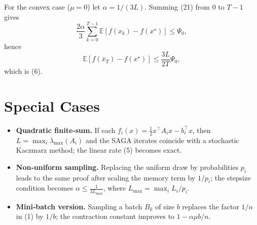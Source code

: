 \documentclass{article}
\begin{document}
For the convex case ($\mu=0$) let $\alpha=1/(3L)$. Summing (21) from $0$ to $T-1$ gives
\[
\frac{2\alpha}{3}\sum_{k=0}^{T-1}\mathbb{E}[f(x_k)-f(x^\star)]
\le \Psi_0,
\]
hence
\[
\mathbb{E}[f(\bar x_T)-f(x^\star)]\le\frac{3L}{2T}\Psi_0,
\]
which is (6).

\section*{Special Cases}
\begin{itemize}
\item \textbf{Quadratic finite‑sum.} If each $f_i(x)=\tfrac12 x^\top A_i x-b_i^\top x$, then $L=\max_i\lambda_{\max}(A_i)$ and the SAGA iterates coincide with a stochastic Kaczmarz method; the linear rate (5) becomes exact.
\item \textbf{Non‑uniform sampling.} Replacing the uniform draw by probabilities $p_i$ leads to the same proof after scaling the memory term by $1/p_i$; the stepsize condition becomes $\alpha\le \frac{1}{3L_{\max}}$, where $L_{\max}=\max_i L_i/p_i$.
\item \textbf{Mini‑batch version.} Sampling a batch $B_k$ of size $b$ replaces the factor $1/n$ in (1) by $1/b$; the contraction constant improves to $1-\alpha\mu b/n$.
\end{itemize}
\end{document}
